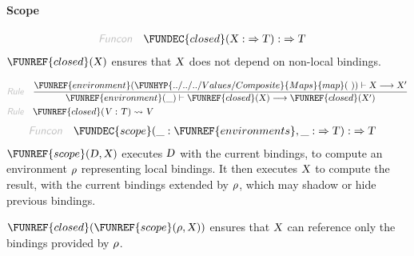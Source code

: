 \paragraph{Scope}\hypertarget{scope}{}\label{scope}

\begin{align*}
  \KEY{Funcon} \quad
  & \FUNDEC{closed}(
                     \VAR{X} :  \TO \VAR{T}) 
    :  \TO \VAR{T} 
\end{align*}
$\FUNREF{closed}
    (  \VAR{X} )$ ensures that $\VAR{X}$ does not depend on non-local bindings.

\begin{align*}
  \KEY{Rule} \quad
    & \frac{
      \FUNREF{environment} (  \FUNHYP{../../../Values/Composite}{Maps}{map}
                                  (   \  ) ) \vdash \VAR{X} \TRANS 
        \VAR{X}'
      }{
      \FUNREF{environment} (  \_ ) \vdash \FUNREF{closed}
                    (  \VAR{X} ) \TRANS 
        \FUNREF{closed}
          (  \VAR{X}' )
      }
\\
  \KEY{Rule} \quad
    & \FUNREF{closed}
        (  \VAR{V} : \VAR{T} ) \leadsto 
        \VAR{V}
\end{align*}
\begin{align*}
  \KEY{Funcon} \quad
  & \FUNDEC{scope}(
                     \_ : \FUNREF{environments}, \_ :  \TO \VAR{T}) 
    :  \TO \VAR{T} 
\end{align*}
$\FUNREF{scope}
    (  \VAR{D}, 
           \VAR{X} )$ executes $\VAR{D}$ with the current bindings, to compute an environment
  $\VAR{\ensuremath{\rho}}$ representing local bindings. It then executes $\VAR{X}$ to compute the result,
  with the current bindings extended by $\VAR{\ensuremath{\rho}}$, which may shadow or hide previous
  bindings.

$\FUNREF{closed}
    (  \FUNREF{scope}
            (  \VAR{\ensuremath{\rho}}, 
                   \VAR{X} ) )$ ensures that $\VAR{X}$ can reference only the bindings
  provided by $\VAR{\ensuremath{\rho}}$.

